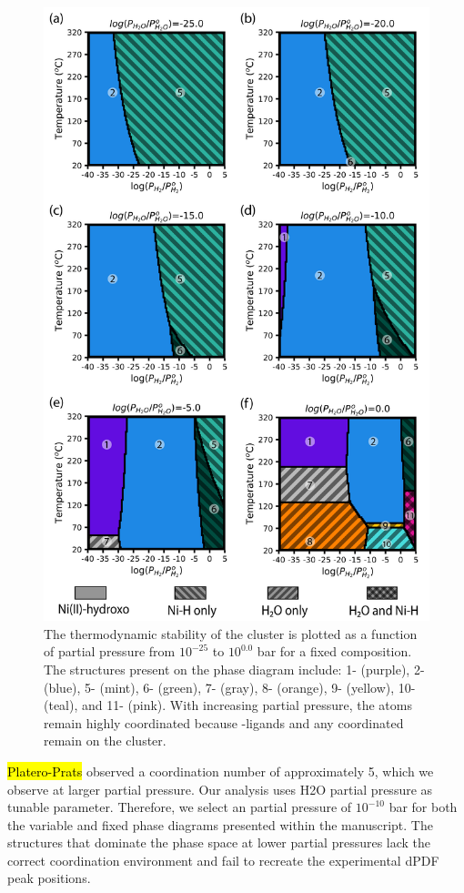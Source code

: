 \documentclass[12pt]{article}
\begin{document}
\begin{figure}[H]
    \centering
    \includegraphics[width=0.60\linewidth]{zi-images/04-SI-images/2021-05-04-Fixed-Ni.png}
    \caption{
    The thermodynamic stability of the cluster is plotted as a function of  partial pressure from $10^{-25}$ to $10^{0.0}$ bar for a fixed  composition. The structures present on the phase diagram include:
        1- (purple),               %
        2- (blue),                 %
        5- (mint),                  %
        6- (green),            %
        7- (gray),             %
        8- (orange),          %
        9- (yellow),           %
        10- (teal), and    %
        11- (pink).        %
    With increasing  partial pressure, the  atoms remain highly coordinated because -ligands and any coordinated  remain on the cluster.  
    }
    \label{fig:SI-phase-Ni-fixed}
\end{figure}

\hl{Platero-Prats} observed a  coordination number of approximately 5, which we observe at larger  partial pressure. Our analysis uses {H2O} partial pressure as tunable parameter. Therefore, we select an  partial pressure of $10^{-10}$ bar for both the variable and fixed  phase diagrams presented within the manuscript. The structures that dominate the phase space at lower  partial pressures lack the correct  coordination environment and fail to recreate the experimental dPDF peak positions. 
\end{document}
